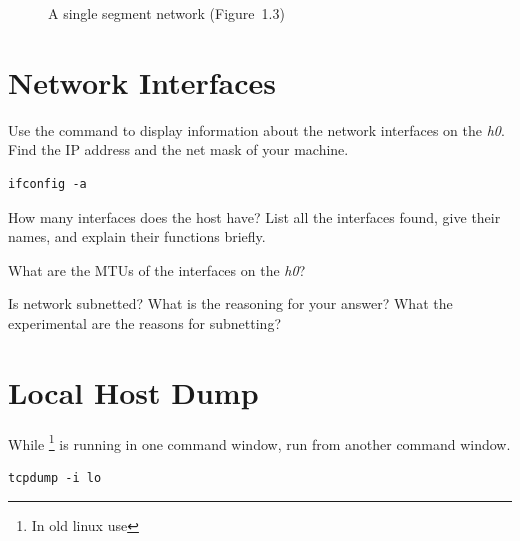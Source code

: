 \documentclass{../UTNetLab}
\begin{document}
\begin{center}
\begin{minipage}{0.48\textwidth}
\begin{flushright}
\begin{figure}[H]
                \caption{A single segment network (Figure~1.3)}\label{fig:1.3}
            \end{figure}
        \end{flushright}
    \end{minipage}
\end{center}

\section{Network Interfaces}
Use the  command to display information about the network interfaces on the \textit{h0}.
Find the IP address and the net mask of your machine.

\begin{lstlisting}
ifconfig -a
\end{lstlisting}

\begin{report}
    \item How many interfaces does the host have?
    List all the interfaces found, give their names, and explain their functions briefly.

    \item What are the MTUs of the interfaces on the \textit{h0}?

    \item Is network subnetted?
    What is the reasoning for your answer? What the experimental are the reasons for subnetting?
\end{report}


\section{Local Host Dump}
While \footnote{In old linux use } is running in one command window, run  from another command window.

\begin{lstlisting}
tcpdump -i lo
\end{lstlisting}
\end{document}
